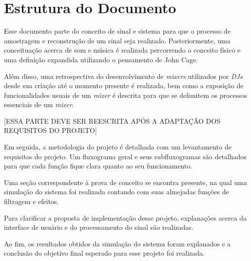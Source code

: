 \section{Estrutura do Documento}

Esse documento parte do conceito de sinal e sistema para que o processo de amostragem e reconstrução de um sinal seja realizado. Posteriormente, uma conceituação acerca de som e música é realizada percorrendo o conceito físico e uma definição expandida utilizando o pensamento de John Cage.

Além disso, uma retrospectiva do desenvolvimento de \textit{mixers} utilizados por \textit{DJs} desde sua criação até o momento presente é realizada, bem como a exposição de funcionalidades usuais de um \textit{mixer} é descrita para que se delimitem os processos essenciais de um \textit{mixer}.

[ESSA PARTE DEVE SER REESCRITA APÓS A ADAPTAÇÃO DOS REQUISITOS DO PROJETO]

Em seguida, a metodologia do projeto é detalhada com um levantamento de requisitos do projeto. Um fluxograma geral e seus subfluxogramas são detalhados para que cada função fique clara quanto ao seu funcionamento.

Uma seção correspondente à prova de conceito se encontra presente, na qual uma simulação do sistema foi realizada contando com suas almejadas funções de filtragem e efeitos.


Para clarificar a proposta de implementação desse projeto, explanações acerca da interface de usuário e do processamento do sinal são realizadas.

Ao fim, os resultados obtidos da simulação do sistema foram explanados e a conclusão do objetivo final esperado para esse projeto foi realizada.